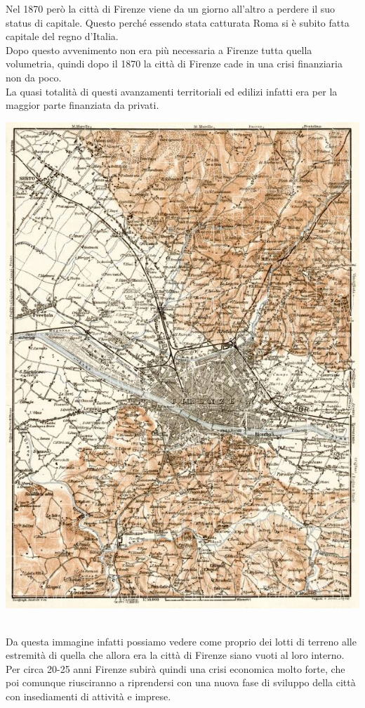 \documentclass[a4paper,12pt, oneside]{book}
\begin{document}
  Nel 1870 però la città di Firenze viene da un giorno all'altro a perdere il suo status di capitale. Questo perché essendo stata catturata Roma si è subito fatta capitale del regno d'Italia.\\
  Dopo questo avvenimento non era più necessaria a Firenze tutta quella volumetria, quindi dopo il 1870 la città di Firenze cade in una crisi finanziaria non da poco.\\ La quasi totalità di questi avanzamenti territoriali ed edilizi infatti era per la maggior parte finanziata da privati.
  \begin{center}
  	\includegraphics[width=0.6\linewidth]{"immagini/firenze dopo la caduta della capitale"}
  	\label{fig:firenze dopo la caduta della capitale}
  \end{center}
  \leavevmode\\ 
  Da questa immagine infatti possiamo vedere come proprio dei lotti di terreno alle estremità di quella che allora era la città di Firenze siano vuoti al loro interno.\\  Per circa 20-25 anni Firenze subirà quindi una crisi economica molto forte, che poi comunque riusciranno a riprendersi con una nuova fase di sviluppo della città con insediamenti di attività e imprese.\\
\end{document}
